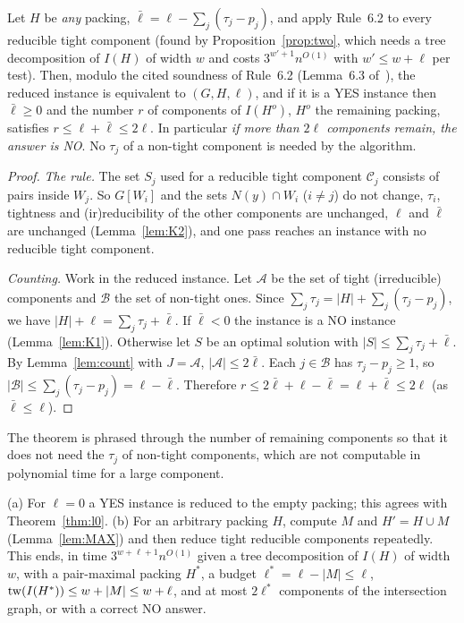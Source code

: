 \begin{theorem}\label{thm:three}
Let $H$ be \emph{any} packing, $\bar\ell=\ell-\sum_j(\tau_j-p_j)$, and apply Rule~6.2 to every reducible tight component (found by Proposition~\ref{prop:two}, which needs a tree decomposition of $I(H)$ of width $w$ and costs $3^{w'+1}n^{O(1)}$ with $w'\le w+\ell$ per test). Then, modulo the cited soundness of Rule~6.2 (Lemma~6.3 of~\cite{BFK18}), the reduced instance is equivalent to $(G,H,\ell)$, and if it is a YES instance then $\bar\ell\ge0$ and the number $r$ of components of $I(H^o)$, $H^o$ the remaining packing, satisfies $r\le\ell+\bar\ell\le2\ell$. In particular \emph{if more than $2\ell$ components remain, the answer is NO}. No $\tau_j$ of a non-tight component is needed by the algorithm.
\end{theorem}
\begin{proof}
\emph{The rule.} The set $S_j$ used for a reducible tight component $\mathcal C_j$ consists of pairs inside $W_j$. So $G[W_i]$ and the sets $N(y)\cap W_i$ ($i\ne j$) do not change, $\tau_i$, tightness and (ir)reducibility of the other components are unchanged, $\ell$ and $\bar\ell$ are unchanged (Lemma~\ref{lem:K2}), and one pass reaches an instance with no reducible tight component.

\emph{Counting.} Work in the reduced instance. Let $\mathcal A$ be the set of tight (irreducible) components and $\mathcal B$ the set of non-tight ones. Since $\sum_j\tau_j=|H|+\sum_j(\tau_j-p_j)$, we have $|H|+\ell=\sum_j\tau_j+\bar\ell$. If $\bar\ell<0$ the instance is a NO instance (Lemma~\ref{lem:K1}). Otherwise let $S$ be an optimal solution with $|S|\le\sum_j\tau_j+\bar\ell$. By Lemma~\ref{lem:count} with $J=\mathcal A$, $|\mathcal A|\le2\bar\ell$. Each $j\in\mathcal B$ has $\tau_j-p_j\ge1$, so $|\mathcal B|\le\sum_j(\tau_j-p_j)=\ell-\bar\ell$. Therefore $r\le2\bar\ell+\ell-\bar\ell=\ell+\bar\ell\le2\ell$ (as $\bar\ell\le\ell$).
\end{proof}
The theorem is phrased through the number of remaining components so that it does not need the $\tau_j$ of non-tight components, which are not computable in polynomial time for a large component.
\begin{corollary}\label{cor:three}
(a) For $\ell=0$ a YES instance is reduced to the empty packing; this agrees with Theorem~\ref{thm:l0}.
(b) For an arbitrary packing $H$, compute $M$ and $H'=H\cup M$ (Lemma~\ref{lem:MAX}) and then reduce tight reducible components repeatedly. This ends, in time $3^{w+\ell+1}n^{O(1)}$ given a tree decomposition of $I(H)$ of width $w$, with a pair-maximal packing $H^*$, a budget $\ell^*=\ell-|M|\le\ell$, $\mathrm{tw}(I(H^*))\le w+|M|\le w+\ell$, and at most $2\ell^*$ components of the intersection graph, or with a correct NO answer.
\end{corollary}
